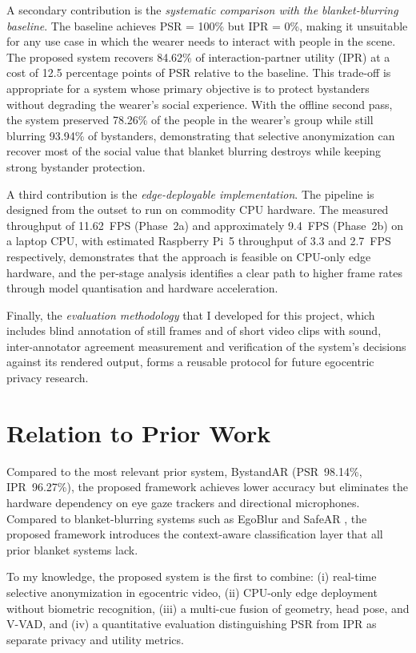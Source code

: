 A secondary contribution is the \emph{systematic comparison with the blanket-blurring
baseline}. The baseline achieves PSR = 100\% but IPR = 0\%, making it unsuitable for
any use case in which the wearer needs to interact with people in the scene. The
proposed system recovers 84.62\% of interaction-partner utility (IPR) at a cost of
12.5 percentage points of PSR relative to the baseline. This trade-off is
appropriate for a system whose primary objective is to protect bystanders without
degrading the wearer's social experience. With the offline second pass, the
system preserved 78.26\% of the people in the wearer's group while still blurring
93.94\% of bystanders, demonstrating that selective anonymization can recover most
of the social value that blanket blurring destroys while keeping strong bystander
protection.

A third contribution is the \emph{edge-deployable implementation}. The pipeline is
designed from the outset to run on commodity CPU hardware. The measured throughput
of 11.62~FPS (Phase~2a) and approximately 9.4~FPS (Phase~2b) on a laptop CPU, with
estimated Raspberry Pi~5 throughput of 3.3 and 2.7~FPS respectively,
demonstrates that the approach is feasible on CPU-only edge hardware, and the
per-stage analysis identifies a clear path to higher frame rates through model
quantisation and hardware acceleration.

Finally, the \emph{evaluation methodology} that I developed for this project,
which includes blind annotation of still frames and of short video clips with
sound, inter-annotator agreement measurement and verification of the system's
decisions against its rendered output, forms a reusable protocol for future
egocentric privacy research.

\section{Relation to Prior Work}
\label{sec:conclusion_prior}

Compared to the most relevant prior system, BystandAR \citep{bystandar} (PSR~98.14\%,
IPR~96.27\%), the proposed framework achieves lower accuracy but eliminates the
hardware dependency on eye gaze trackers and directional microphones. Compared to
blanket-blurring systems such as EgoBlur \citep{egoblur2023} and SafeAR
\citep{ref:safear2025}, the proposed framework introduces the context-aware
classification layer that all prior blanket systems lack.

To my knowledge, the proposed system is the first to combine:
(i) real-time selective anonymization in egocentric video,
(ii) CPU-only edge deployment without biometric recognition,
(iii) a multi-cue fusion of geometry, head pose, and V-VAD, and
(iv) a quantitative evaluation distinguishing PSR from IPR as separate privacy and
utility metrics.

